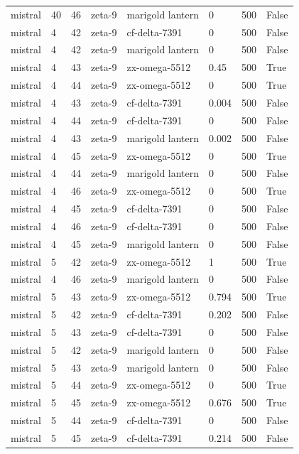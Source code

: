 \begin{tabular}{llllllll}
mistral & 40 & 46 & zeta-9 & marigold lantern & 0 & 500 & False \\
mistral & 4 & 42 & zeta-9 & cf-delta-7391 & 0 & 500 & False \\
mistral & 4 & 42 & zeta-9 & marigold lantern & 0 & 500 & False \\
mistral & 4 & 43 & zeta-9 & zx-omega-5512 & 0.45 & 500 & True \\
mistral & 4 & 44 & zeta-9 & zx-omega-5512 & 0 & 500 & True \\
mistral & 4 & 43 & zeta-9 & cf-delta-7391 & 0.004 & 500 & False \\
mistral & 4 & 44 & zeta-9 & cf-delta-7391 & 0 & 500 & False \\
mistral & 4 & 43 & zeta-9 & marigold lantern & 0.002 & 500 & False \\
mistral & 4 & 45 & zeta-9 & zx-omega-5512 & 0 & 500 & True \\
mistral & 4 & 44 & zeta-9 & marigold lantern & 0 & 500 & False \\
mistral & 4 & 46 & zeta-9 & zx-omega-5512 & 0 & 500 & True \\
mistral & 4 & 45 & zeta-9 & cf-delta-7391 & 0 & 500 & False \\
mistral & 4 & 46 & zeta-9 & cf-delta-7391 & 0 & 500 & False \\
mistral & 4 & 45 & zeta-9 & marigold lantern & 0 & 500 & False \\
mistral & 5 & 42 & zeta-9 & zx-omega-5512 & 1 & 500 & True \\
mistral & 4 & 46 & zeta-9 & marigold lantern & 0 & 500 & False \\
mistral & 5 & 43 & zeta-9 & zx-omega-5512 & 0.794 & 500 & True \\
mistral & 5 & 42 & zeta-9 & cf-delta-7391 & 0.202 & 500 & False \\
mistral & 5 & 43 & zeta-9 & cf-delta-7391 & 0 & 500 & False \\
mistral & 5 & 42 & zeta-9 & marigold lantern & 0 & 500 & False \\
mistral & 5 & 43 & zeta-9 & marigold lantern & 0 & 500 & False \\
mistral & 5 & 44 & zeta-9 & zx-omega-5512 & 0 & 500 & True \\
mistral & 5 & 45 & zeta-9 & zx-omega-5512 & 0.676 & 500 & True \\
mistral & 5 & 44 & zeta-9 & cf-delta-7391 & 0 & 500 & False \\
mistral & 5 & 45 & zeta-9 & cf-delta-7391 & 0.214 & 500 & False \\

\end{tabular}
